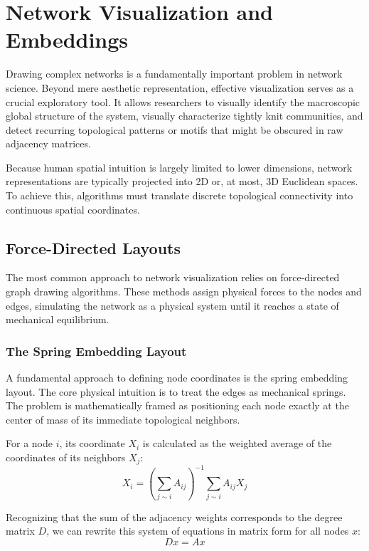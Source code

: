 \section{Network Visualization and Embeddings}
\label{sec:network_visualization}

Drawing complex networks is a fundamentally important problem in network science. Beyond mere aesthetic representation, effective visualization serves as a crucial exploratory tool. It allows researchers to visually identify the macroscopic global structure of the system, visually characterize tightly knit communities, and detect recurring topological patterns or motifs that might be obscured in raw adjacency matrices.

Because human spatial intuition is largely limited to lower dimensions, network representations are typically projected into 2D or, at most, 3D Euclidean spaces. To achieve this, algorithms must translate discrete topological connectivity into continuous spatial coordinates.

\subsection{Force-Directed Layouts}
\label{subsec:force_directed_layouts}

The most common approach to network visualization relies on force-directed graph drawing algorithms. These methods assign physical forces to the nodes and edges, simulating the network as a physical system until it reaches a state of mechanical equilibrium.

\subsubsection{The Spring Embedding Layout}
\label{subsubsec:spring_embedding}

A fundamental approach to defining node coordinates is the spring embedding layout. The core physical intuition is to treat the edges as mechanical springs. The problem is mathematically framed as positioning each node exactly at the center of mass of its immediate topological neighbors.

For a node $i$, its coordinate $X_i$ is calculated as the weighted average of the coordinates of its neighbors $X_j$:
$$X_i = \left( \sum_{j \sim i} A_{ij} \right)^{-1} \sum_{j \sim i} A_{ij} X_j$$

Recognizing that the sum of the adjacency weights corresponds to the degree matrix $D$, we can rewrite this system of equations in matrix form for all nodes $x$:
$$Dx = Ax$$

